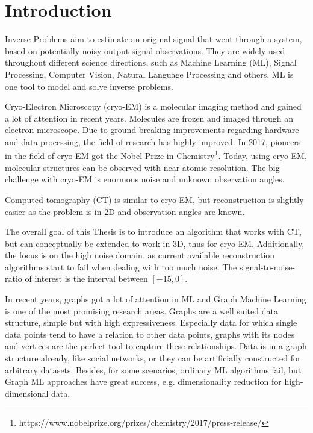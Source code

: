 \chapter{Introduction}
\label{sec:introduction}

Inverse Problems aim to estimate an original signal that went through a system, 
based on potentially noisy output signal observations.
They are widely used throughout different science directions, such as Machine Learning (ML),
Signal Processing, Computer Vision, Natural Language Processing and others.
ML is one tool to model and solve inverse problems.


\bigskip

Cryo-Electron Microscopy (cryo-EM) is a molecular imaging method and gained a lot of attention in recent years. 
Molecules are frozen and imaged through an electron microscope.
Due to ground-breaking improvements regarding hardware and data processing, the field of research
has highly improved. In 2017, pioneers in the field of cryo-EM got the 
Nobel Prize in Chemistry\footnote{https://www.nobelprize.org/prizes/chemistry/2017/press-release/}.
Today, using cryo-EM, molecular structures can be observed with near-atomic resolution.
The big challenge with cryo-EM is enormous noise and unknown observation angles.

Computed tomography (CT) is similar to cryo-EM, but reconstruction is slightly easier
as the problem is in 2D and observation angles are known.

The overall goal of this Thesis is to introduce an algorithm that works with CT, but 
can conceptually be extended to work in 3D, thus for cryo-EM. 
Additionally, the focus is on the high noise domain, as current available reconstruction algorithms
start to fail when dealing with too much noise. The signal-to-noise-ratio of interest is the interval 
 between $[-15, 0]$.

\bigskip

In recent years, graphs got a lot of attention in ML and Graph Machine Learning is one of the most promising research areas.
Graphs are a well suited data structure, simple but with high expressiveness. 
Especially data for which single data points tend to have a relation to other data points, graphs with its nodes and vertices are the perfect tool
to capture these relationships. 
Data is in a graph structure already, like social networks, or they can be artificially constructed for arbitrary datasets.
Besides, for some scenarios, ordinary ML algorithms fail, but Graph ML approaches have great success, e.g. dimensionality reduction for high-dimensional data.



